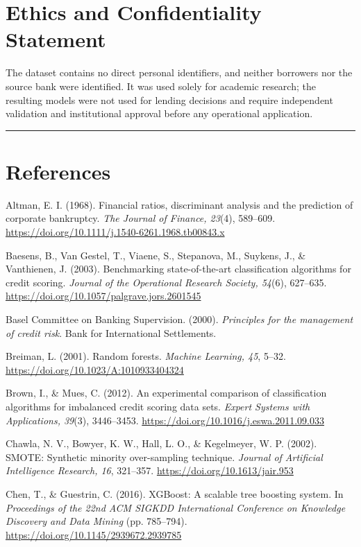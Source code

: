 \documentclass[11pt,a4paper]{article}
\newcommand{\refitem}[1]{\par\noindent\hangindent=1cm\hangafter=1 #1\par\smallskip}
\begin{document}
\section*{Ethics and Confidentiality Statement}

The dataset contains no direct personal identifiers, and neither borrowers nor the source bank were identified. It was used solely for academic research; the resulting models were not used for lending decisions and require independent validation and institutional approval before any operational application.

\bigskip
\hrule
\bigskip

\section*{References}
\begingroup
\setlength{\parindent}{0pt}

\refitem{Altman, E. I. (1968). Financial ratios, discriminant analysis and the prediction of corporate bankruptcy. \textit{The Journal of Finance, 23}(4), 589--609. \url{https://doi.org/10.1111/j.1540-6261.1968.tb00843.x}}

\refitem{Baesens, B., Van Gestel, T., Viaene, S., Stepanova, M., Suykens, J., \& Vanthienen, J. (2003). Benchmarking state-of-the-art classification algorithms for credit scoring. \textit{Journal of the Operational Research Society, 54}(6), 627--635. \url{https://doi.org/10.1057/palgrave.jors.2601545}}

\refitem{Basel Committee on Banking Supervision. (2000). \textit{Principles for the management of credit risk}. Bank for International Settlements.}

\refitem{Breiman, L. (2001). Random forests. \textit{Machine Learning, 45}, 5--32. \url{https://doi.org/10.1023/A:1010933404324}}

\refitem{Brown, I., \& Mues, C. (2012). An experimental comparison of classification algorithms for imbalanced credit scoring data sets. \textit{Expert Systems with Applications, 39}(3), 3446--3453. \url{https://doi.org/10.1016/j.eswa.2011.09.033}}

\refitem{Chawla, N. V., Bowyer, K. W., Hall, L. O., \& Kegelmeyer, W. P. (2002). SMOTE: Synthetic minority over-sampling technique. \textit{Journal of Artificial Intelligence Research, 16}, 321--357. \url{https://doi.org/10.1613/jair.953}}

\refitem{Chen, T., \& Guestrin, C. (2016). XGBoost: A scalable tree boosting system. In \textit{Proceedings of the 22nd ACM SIGKDD International Conference on Knowledge Discovery and Data Mining} (pp. 785--794). \url{https://doi.org/10.1145/2939672.2939785}}
\end{document}
